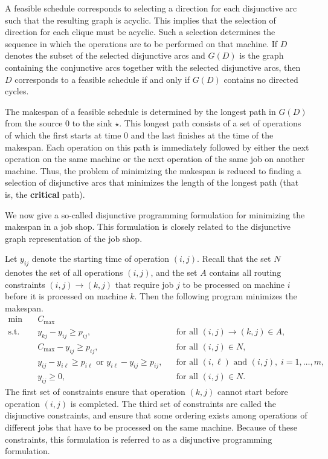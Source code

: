 A feasible schedule corresponds to selecting a direction for each 
disjunctive arc such that the resulting graph is acyclic. This implies that 
the selection of direction for each clique must be acyclic. Such a 
selection determines the sequence in which the operations are to be 
performed on that machine. If $D$ denotes the subset of the selected 
disjunctive arcs and $G(D)$ is the graph containing the conjunctive 
arcs together with the selected disjunctive arcs, then $D$ corresponds 
to a feasible schedule if and only if $G(D)$ contains no directed cycles. 

The makespan of a feasible schedule is determined by the longest path 
in $G(D)$ from the source $0$ to the sink $\star$. This longest path 
consists of a set of operations of which the first starts at time $0$ 
and the last finishes at the time of the makespan. Each operation 
on this path is immediately followed by either the next operation on the 
same machine or the next operation of the same job on another machine. 
Thus, the problem of minimizing the makespan is reduced to finding a 
selection of disjunctive arcs that minimizes the length of the longest 
path (that is, the {\bf critical} path). 

We now give a so-called disjunctive programming formulation for minimizing 
the makespan in a job shop. This formulation is closely related to 
the disjunctive graph representation of the job shop. 

Let $y_{ij}$ denote the starting time of operation $(i, j)$. Recall 
that the set $N$ denotes the set of all operations $(i, j)$, and 
the set $A$ contains all routing constraints $(i, j) \to (k, j)$ that 
require job $j$ to be processed on machine $i$ before it is processed on 
machine $k$. Then the following program minimizes the makespan. 
\begin{align*}
    \min\quad & C_{\max} \\ 
    \text{s.t.}\quad & y_{kj} - y_{ij} \geq p_{ij}, && \text{for all } (i, j) \to (k, j) \in A, \\ 
    & C_{\max} - y_{ij} \geq p_{ij}, && \text{for all } (i, j) \in N, \\ 
    & y_{ij} - y_{i\ell} \geq p_{i\ell} \text{ or } y_{i\ell} - y_{ij} \geq p_{ij}, 
        && \text{for all } (i, \ell) \text{ and } (i, j),\; i = 1, \dots, m, \\ 
    & y_{ij} \geq 0, && \text{for all } (i, j) \in N. 
\end{align*}
The first set of constraints ensure that operation $(k, j)$ cannot start before 
operation $(i, j)$ is completed. The third set of constraints are called the 
disjunctive constraints, and ensure that some ordering exists among operations 
of different jobs that have to be processed on the same machine. Because of 
these constraints, this formulation is referred to as a disjunctive programming 
formulation. 

